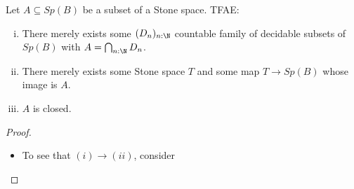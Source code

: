 %
%

\begin{theorem}
  Let $A\subseteq Sp(B)$ be a subset of a Stone space. TFAE:
  \begin{enumerate}[(i)]
    \item There merely exists some $(D_n)_{n:\N}$ countable family 
      of decidable subsets of $Sp(B)$ with $A = \bigcap_{n:\N} D_n$. 
    \item There merely exists some Stone space $T$ and some map $T\to Sp(B)$ 
      whose image is $A$. 
    \item $A$ is closed. 
  \end{enumerate}
\end{theorem}
\begin{proof}
  \begin{itemize}
    \item To see that $(i) \to (ii)$, consider 
  \end{itemize}
\end{proof} 




